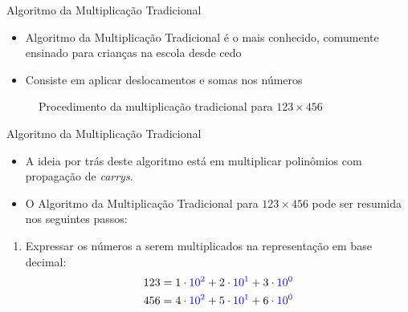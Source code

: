\documentclass{beamer}
\newcounter{saveenumi}
\newcommand{\seti}{\setcounter{saveenumi}{\value{enumi}}}
\begin{document}
\begin{frame}{Algoritmo da Multiplicação Tradicional}
	\begin{itemize}
		\item Algoritmo da Multiplicação Tradicional é o mais conhecido, comumente ensinado para crianças na escola desde cedo
		\item Consiste em aplicar deslocamentos e somas nos números
	\end{itemize}

	\begin{figure}[H]
		\centering
		\begin{center} \qquad \end{center}
		\caption{Procedimento da multiplicação tradicional para $123\times 456$}
		\label{fig:label}
	\end{figure}
\end{frame}

\begin{frame}{Algoritmo da Multiplicação Tradicional}

	\begin{itemize} 
		\item A ideia por trás deste algoritmo está em multiplicar polinômios com propagação de \textit{carrys}.\\
		\item O Algoritmo da Multiplicação Tradicional para $123\times456$ pode ser resumida nos seguintes passos:
	\end{itemize}

	\begin{enumerate}
		\item Expressar os números a serem multiplicados na representação em base decimal:
		\begin{equation}
			\begin{split}
				123&=1\cdot\textcolor{blue}{10^2}+2\cdot\textcolor{blue}{10^1}+3\cdot\textcolor{blue}{10^0}\\
				456&=4\cdot\textcolor{blue}{10^2}+5\cdot\textcolor{blue}{10^1}+6\cdot\textcolor{blue}{10^0}
			\end{split}
		\end{equation}
	\end{enumerate}

	\seti

\end{frame}
\end{document}
